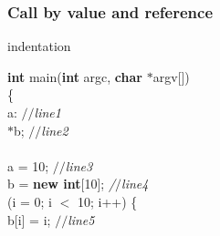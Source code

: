 \documentclass[compress]{beamer}
\begin{document}
\frame
{
  \frametitle{Call by value and reference}
\begin{small}
{\scriptsize
{\small
\expandafter\ifx\csname indentation\endcsname\relax
\newlength{\indentation}\fi
\setlength{\indentation}{0.5em}
\begin{flushleft}
{\bf int\/} main({\bf int\/} argc, {\bf char\/} $\ast$argv[])\mbox{}\\
\{\mbox{}\\
\hspace*{3\indentation}{\bf int\/}     a:                                                          \hfill{\em $//$\hspace*{1\indentation}line\hspace*{1\indentation}1\hspace*{1\indentation}}\mbox{}\\
\hspace*{3\indentation}{\bf int\/}     $\ast$b;                                                         \hfill{\em $//$\hspace*{1\indentation}line\hspace*{1\indentation}2\hspace*{1\indentation}}\mbox{}\\
\mbox{}\\
\hspace*{3\indentation}a = 10;                                                           \hfill{\em $//$\hspace*{1\indentation}line\hspace*{1\indentation}3\hspace*{1\indentation}}\mbox{}\\
\hspace*{3\indentation}b = {\bf new int}[10];                             \hfill{\em /$/$\hspace*{1\indentation}line\hspace*{1\indentation}4\hspace*{1\indentation}}\mbox{}\\
\hspace*{3\indentation}{\bf for\/}(i = 0; i $<$ 10; i++) \{\mbox{}\\
\hspace*{5\indentation}b[i] = i;                                                      \hfill{\em $//$\hspace*{1\indentation}line\hspace*{1\indentation}5\hspace*{1\indentation}}\mbox{}\\

\end{flushleft}}}
\end{small}}
\end{document}
